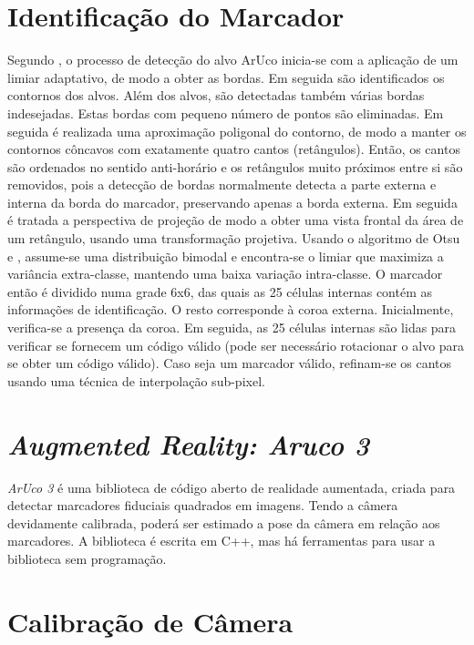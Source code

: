 \section{Identificação do Marcador}

Segundo \citet{Salinas2013}, o processo de detecção do alvo ArUco inicia-se com a aplicação de um limiar adaptativo, de modo a obter as bordas. Em seguida são identificados os contornos dos alvos. Além dos alvos, são detectadas também várias bordas indesejadas. Estas bordas com pequeno número de pontos são eliminadas. Em seguida é realizada uma aproximação poligonal do contorno, de modo a manter os contornos côncavos com exatamente quatro cantos (retângulos). Então, os cantos são ordenados no sentido anti-horário e os retângulos muito próximos entre si são removidos, pois a detecção de bordas normalmente detecta a parte externa e interna da borda do marcador, preservando apenas a borda externa. Em seguida é tratada a perspectiva de projeção de modo a obter uma vista frontal da área de um retângulo, usando uma transformação projetiva. Usando o algoritmo de Otsu \cite{OTSU1979} e \cite{Artero2000}, assume-se uma distribuição bimodal e encontra-se o limiar que maximiza a variância extra-classe, mantendo uma baixa variação intra-classe. O marcador então é dividido numa grade 6x6, das quais as 25 células internas contém as informações de identificação. O resto corresponde à coroa externa. Inicialmente, verifica-se a presença da coroa. Em seguida, as 25 células internas são lidas para verificar se fornecem um código válido (pode ser necessário rotacionar o alvo para se obter um código válido). Caso seja um marcador válido, refinam-se os cantos usando uma técnica de interpolação sub-pixel.

\section{\textit{Augmented Reality: Aruco 3}}

\textit{ArUco 3} é uma biblioteca de código aberto de realidade aumentada, criada para detectar marcadores fiduciais quadrados em imagens. Tendo a câmera devidamente calibrada, poderá ser estimado a pose da câmera em relação aos marcadores. A biblioteca é escrita em C++, mas há ferramentas para usar a biblioteca sem programação.

\section{Calibração de Câmera}

